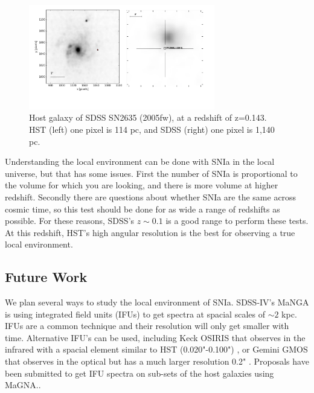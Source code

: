 \documentclass[apj, iop]{emulateapj}
\newcommand{\sn}{SNIa}
\begin{document}
\begin{figure}
	\includegraphics[width=3.2in]{SN2635-combined-inverted.pdf}
	\caption{Host galaxy of SDSS SN2635 (2005fw), at a redshift of z=0.143. HST 
	(left) one pixel is 114 pc, and SDSS (right) one pixel is 1,140 pc.}
	\label{f:galaxy-compare}
\end{figure}

Understanding the local environment can be done with \sn{} in the local universe,
but that has some issues. First the number of \sn{} is proportional to the volume
for which you are looking, and there is more volume at higher redshift. Secondly
there are questions about whether \sn{} are the same across cosmic time, so this
test should be done for as wide a range of redshifts as possible. For these
reasons, SDSS's $z \sim 0.1$ is a good range to perform these tests. At this
redshift, HST's high angular resolution is the best for observing a true local
environment.



\subsection{Future Work}\label{future-work-1}

We plan several ways to study the local environment of SNIa. SDSS-IV's MaNGA is using integrated
field units (IFUs) to get spectra at spacial scales of $\sim 2$ kpc. IFUs are a
common technique and their resolution will only get smaller with time.
Alternative IFU's can be used, including Keck OSIRIS that observes in the
infrared with a spacial element similar to HST (0.020"-0.100") \citep{OSIRIS},
or Gemini GMOS that observes in
the optical but has a much larger resolution 0.2" \citep{Gemini}.
Proposals have been submitted to 
get IFU spectra on sub-sets of the host galaxies using MaGNA..
\end{document}
